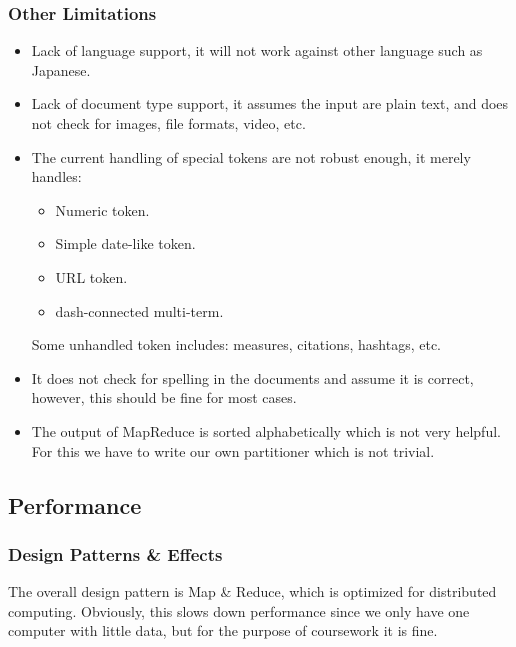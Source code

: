 \documentclass[
]{article}
\begin{document}
\hypertarget{header-n77}{%
\subsubsection{Other Limitations}\label{header-n77}}

\begin{itemize}
\item
  Lack of language support, it will not work against other language such
  as Japanese.
\item
  Lack of document type support, it assumes the input are plain text,
  and does not check for images, file formats, video, etc.
\item
  The current handling of special tokens are not robust enough, it
  merely handles:

  \begin{itemize}
  \item
    Numeric token.
  \item
    Simple date-like token.
  \item
    URL token.
  \item
    dash-connected multi-term.
  \end{itemize}

  Some unhandled token includes: measures, citations, hashtags, etc.
\item
  It does not check for spelling in the documents and assume it is
  correct, however, this should be fine for most cases.
\item
  The output of MapReduce is sorted alphabetically which is not very
  helpful. For this we have to write our own partitioner which is not
  trivial.
\end{itemize}

\hypertarget{header-n101}{%
\subsection{Performance}\label{header-n101}}

\hypertarget{header-n102}{%
\subsubsection{Design Patterns \& Effects}\label{header-n102}}

The overall design pattern is Map \& Reduce, which is optimized for
distributed computing. Obviously, this slows down performance since we
only have one computer with little data, but for the purpose of
coursework it is fine.
\end{document}
